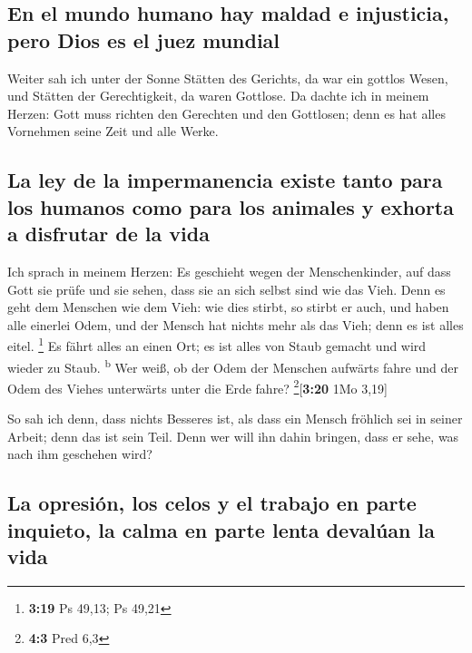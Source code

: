 \hypertarget{en-el-mundo-humano-hay-maldad-e-injusticia-pero-dios-es-el-juez-mundial}{%
\subsection{En el mundo humano hay maldad e injusticia, pero Dios es el
juez
mundial}\label{en-el-mundo-humano-hay-maldad-e-injusticia-pero-dios-es-el-juez-mundial}}

 Weiter sah ich unter der Sonne Stätten des Gerichts, da
war ein gottlos Wesen, und Stätten der Gerechtigkeit, da waren Gottlose.
 Da dachte ich in meinem Herzen: Gott muss richten den
Gerechten und den Gottlosen; denn es hat alles Vornehmen seine Zeit und
alle Werke.

\hypertarget{la-ley-de-la-impermanencia-existe-tanto-para-los-humanos-como-para-los-animales-y-exhorta-a-disfrutar-de-la-vida}{%
\subsection{La ley de la impermanencia existe tanto para los humanos
como para los animales y exhorta a disfrutar de la
vida}\label{la-ley-de-la-impermanencia-existe-tanto-para-los-humanos-como-para-los-animales-y-exhorta-a-disfrutar-de-la-vida}}

 Ich sprach in meinem Herzen: Es geschieht wegen der
Menschenkinder, auf dass Gott sie prüfe und sie sehen, dass sie an sich
selbst sind wie das Vieh.  Denn es geht dem Menschen wie
dem Vieh: wie dies stirbt, so stirbt er auch, und haben alle einerlei
Odem, und der Mensch hat nichts mehr als das Vieh; denn es ist alles
eitel. \footnote{\textbf{3:19} Ps 49,13; Ps 49,21}  Es
fährt alles an einen Ort; es ist alles von Staub gemacht und wird wieder
zu Staub. \textsuperscript{b}  Wer weiß, ob der Odem der
Menschen aufwärts fahre und der Odem des Viehes unterwärts unter die
Erde fahre? \footnote{\textbf{4:3} Pred 6,3}{[}\textbf{3:20} 1Mo 3,19{]}

 So sah ich denn, dass nichts Besseres ist, als dass ein
Mensch fröhlich sei in seiner Arbeit; denn das ist sein Teil. Denn wer
will ihn dahin bringen, dass er sehe, was nach ihm geschehen wird?

\hypertarget{la-opresiuxf3n-los-celos-y-el-trabajo-en-parte-inquieto-la-calma-en-parte-lenta-devaluxfaan-la-vida}{%
\subsection{La opresión, los celos y el trabajo en parte inquieto, la
calma en parte lenta devalúan la
vida}\label{la-opresiuxf3n-los-celos-y-el-trabajo-en-parte-inquieto-la-calma-en-parte-lenta-devaluxfaan-la-vida}}

